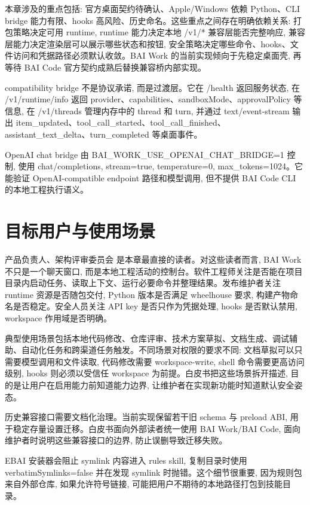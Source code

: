 本章涉及的重点包括: 官方桌面契约待确认、Apple/Windows 依赖 Python、CLI bridge 能力有限、hooks 高风险、历史命名。这些重点之间存在明确依赖关系: 打包策略决定可用 runtime, runtime 能力决定本地 /v1/* 兼容层能否完整响应, 兼容层能力决定渲染层可以展示哪些状态和按钮, 安全策略决定哪些命令、hooks、文件访问和凭据路径必须默认收敛。BAI Work 的当前实现倾向于先稳定桌面壳, 再等待 BAI Code 官方契约成熟后替换兼容桥内部实现。

compatibility bridge 不是协议承诺, 而是过渡层。它在 /health 返回服务状态, 在 /v1/runtime/info 返回 provider、capabilities、sandboxMode、approvalPolicy 等信息, 在 /v1/threads 管理内存中的 thread 和 turn, 并通过 text/event-stream 输出 item\_updated、tool\_call\_started、tool\_call\_finished、assistant\_text\_delta、turn\_completed 等桌面事件。

OpenAI chat bridge 由 BAI\_WORK\_USE\_OPENAI\_CHAT\_BRIDGE=1 控制, 使用 chat/completions, stream=true, temperature=0, max\_tokens=1024。它能验证 OpenAI-compatible endpoint 路径和模型调用, 但不提供 BAI Code CLI 的本地工程执行语义。

\section{目标用户与使用场景}
产品负责人、架构评审委员会 是本章最直接的读者。对这些读者而言, BAI Work 不只是一个聊天窗口, 而是本地工程活动的控制台。软件工程师关注是否能在项目目录内启动任务、读取上下文、运行必要命令并整理结果。发布维护者关注 runtime 资源是否随包交付, Python 版本是否满足 wheelhouse 要求, 构建产物命名是否稳定。安全人员关注 API key 是否只作为凭据处理, hooks 是否默认禁用, workspace 作用域是否明确。

典型使用场景包括本地代码修改、仓库评审、技术方案草拟、文档生成、调试辅助、自动化任务和跨渠道任务触发。不同场景对权限的要求不同: 文档草拟可以只需要模型调用和文件读取, 代码修改需要 workspace-write, shell 命令需要更高访问级别, hooks 则必须以受信任 workspace 为前提。白皮书把这些场景拆开描述, 目的是让用户在启用能力前知道能力边界, 让维护者在实现新功能时知道默认安全姿态。

历史兼容接口需要文档化治理。当前实现保留若干旧 schema 与 preload ABI, 用于稳定存量设置迁移。白皮书面向外部读者统一使用 BAI Work/BAI Code, 面向维护者时说明这些兼容接口的边界, 防止误删导致迁移失败。

EBAI 安装器会阻止 symlink 内容进入 rules skill, 复制目录时使用 verbatimSymlinks=false 并在发现 symlink 时抛错。这个细节很重要, 因为规则包来自外部仓库, 如果允许符号链接, 可能把用户不期待的本地路径打包到技能目录。

